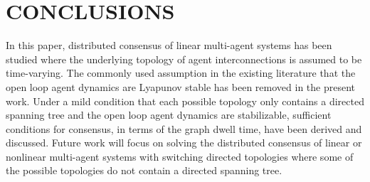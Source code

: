 \documentclass[letterpaper, 10 pt, conference]{ieeeconf}
\begin{document}
\section{CONCLUSIONS}
In this paper, distributed consensus of linear
multi-agent systems has been studied where the underlying topology of agent
interconnections is assumed to be time-varying. The commonly used assumption
in the existing literature that the open loop agent dynamics
are Lyapunov stable has been removed in the present work. Under a mild
condition that each possible topology only contains a directed spanning
tree and the open loop agent dynamics are stabilizable, sufficient
conditions for consensus, in terms of the graph dwell time, have been
derived and discussed. Future work will
focus on solving the distributed consensus of linear or nonlinear
multi-agent systems with switching directed topologies where some of the
possible topologies do not contain a directed spanning tree.



\addtolength{\textheight}{-12cm}   
\end{document}
